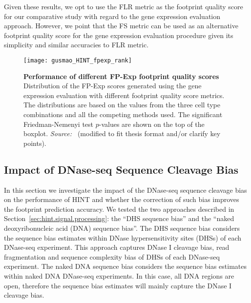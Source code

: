Given these results, we opt to use the FLR metric as the footprint quality score for our comparative study with regard to the gene expression evaluation approach. However, we point that the FS metric can be used as an alternative footprint quality score for the gene expression evaluation procedure given its simplicity and similar accuracies to FLR metric.

\begin{figure}[h!]
\centering
\texttt{[image: gusmao\_HINT\_fpexp\_rank]}
\caption[Performance of different FP-Exp footprint quality scores]{\textbf{Performance of different FP-Exp footprint quality scores} Distribution of the FP-Exp scores generated using the gene expression evaluation with different footprint quality score metrics. The distributions are based on the values from the three cell type combinations and all the competing methods used. The significant Friedman-Nemenyi test $p$-values are shown on the top of the boxplot. \emph{Source:~\cite{gusmao2016}} (modified to fit thesis format and/or clarify key points).}
\label{fig:gusmao_HINT_fpexp_rank}
\end{figure}

\subsection{Impact of DNase-seq Sequence Cleavage Bias}
\label{sec:impact.dnase.sequence.cleavage.bias}

In this section we investigate the impact of the DNase-seq sequence cleavage bias on the performance of HINT and whether the correction of such bias improves the footprint prediction accuracy. We tested the two approaches described in Section~\ref{sec:hint.signal.processing}: the ``DHS sequence bias'' and the ``naked deoxyribonucleic acid (DNA) sequence bias''. The DHS sequence bias considers the sequence bias estimates within DNase hypersensitivity sites (DHSs) of each DNase-seq experiment. This approach captures DNase I cleavage bias, read fragmentation and sequence complexity bias of DHSs of each DNase-seq experiment. The naked DNA sequence bias considers the sequence bias estimates within naked DNA DNase-seq experiments. In this case, all DNA regions are open, therefore the sequence bias estimates will mainly capture the DNase I cleavage bias.

